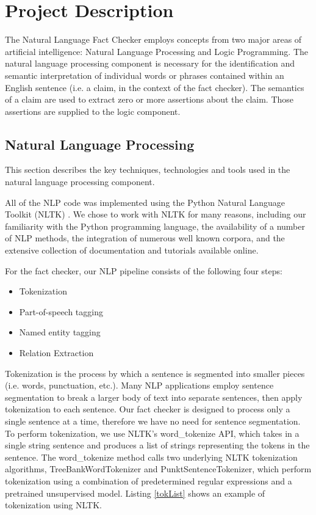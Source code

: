 \documentclass{chi2009}
\begin{document}
\section{Project Description}

The Natural Language Fact Checker employs concepts from two major areas of artificial intelligence: Natural Language Processing and Logic Programming.  The natural language processing component is necessary for the identification and semantic interpretation of individual words or phrases contained within an English sentence (i.e. a claim, in the context of the fact checker).  The semantics of a claim are used to extract zero or more assertions about the claim.  Those assertions are supplied to the logic component.  

\subsection{Natural Language Processing}

This section describes the key techniques, technologies and tools used in the natural language processing component.  

All of the NLP code was implemented using the Python Natural Language Toolkit (NLTK) \cite{nltk}.  We chose to work with NLTK for many reasons, including our familiarity with the Python programming language, the availability of a number of NLP methods, the integration of numerous well known corpora, and the extensive collection of documentation and tutorials available online.
 
For the fact checker, our NLP pipeline consists of the following four steps:

\begin{itemize}
   \item Tokenization
   \item Part-of-speech tagging
   \item Named entity tagging
   \item Relation Extraction
\end{itemize}

Tokenization is the process by which a sentence is segmented into smaller pieces (i.e. words, punctuation, etc.).  Many NLP applications employ sentence segmentation to break a larger body of text into separate sentences, then apply tokenization to each sentence.  Our fact checker is designed to process only a single sentence at a time, therefore we have no need for sentence segmentation.  To perform tokenization, we use NLTK's word\_tokenize API, which takes in a single string sentence and produces a list of strings representing the tokens in the sentence.  The word\_tokenize method calls two underlying NLTK tokenization algorithms, TreeBankWordTokenizer and PunktSentenceTokenizer, which perform tokenization using a combination of predetermined regular expressions and a pretrained unsupervised model. Listing \ref{tokList} shows an example of tokenization using NLTK.
\end{document}
